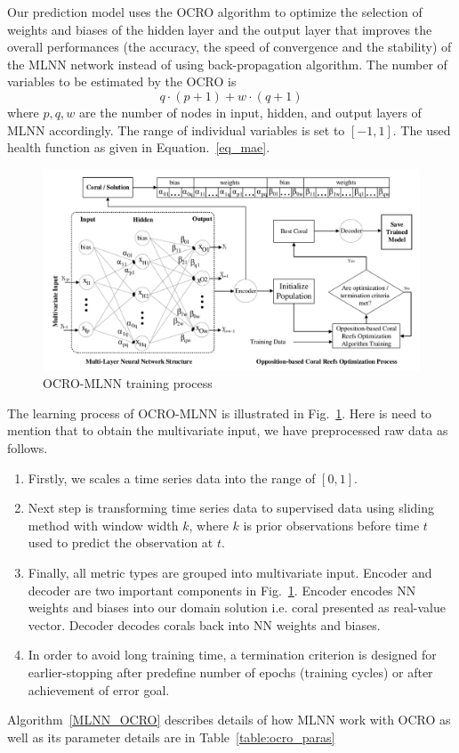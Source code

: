 \documentclass[review,3p,authoryear]{elsarticle}
\begin{document}
Our prediction model uses the OCRO algorithm to optimize the selection of weights and biases of the hidden layer and the output  layer that improves the overall performances (the accuracy, the speed of convergence and the stability) of the MLNN network instead of using back-propagation algorithm. The number of variables to be estimated by the OCRO is 
\begin{equation}
	q \cdot (p + 1) + w \cdot (q + 1) 
\end{equation}
where $p, q, w$ are the number of nodes in input, hidden, and output layers of MLNN accordingly. 
The range of individual variables is set to $[-1, 1]$. 
The used health function as given in Equation.~\ref{eq_mae}.

\begin{figure}
	\begin{center}
		\includegraphics[width=1.0\textwidth =0cm 0cm 0cm 0cm, clip]{images/pdf/system/cro_training_final.pdf}
		\caption{OCRO-MLNN training process}
		\label{fig_ocro_training}
	\end{center}
\end{figure}

The learning process of OCRO-MLNN is illustrated in Fig.~\ref{fig_ocro_training}. Here is need to mention that to obtain the multivariate input, we have preprocessed raw data as follows. 
\begin{enumerate}
	\item Firstly, we scales a time series data into the range of $[0, 1]$. 
	\item Next step is transforming time series data to supervised data using sliding method with window width $k$, where $k$ is prior observations before time $t$ used to predict the observation at $t$. 
	\item Finally, all metric types are grouped into multivariate input. Encoder and decoder are two important components in Fig.~\ref{fig_ocro_training}. 
Encoder encodes NN weights and biases into our domain solution i.e. coral presented as real-value vector. 
Decoder decodes corals back into NN weights and biases. 
	\item In order to avoid long training time, a termination criterion is designed for earlier-stopping after predefine number of epochs (training cycles) or after achievement of error goal. 
\end{enumerate}
Algorithm~\ref{MLNN_OCRO} describes details of how MLNN work with OCRO as well as its parameter details are in Table~\ref{table:ocro_paras}
\end{document}
